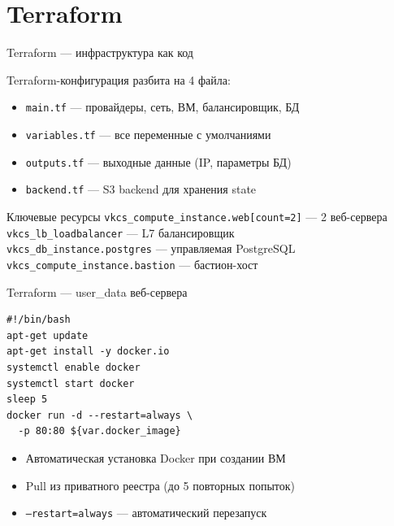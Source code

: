 \documentclass[10pt,aspectratio=169]{beamer}
\begin{document}
\section{Terraform}

\begin{frame}{Terraform --- инфраструктура как код}

  Terraform-конфигурация разбита на 4 файла:

  \begin{itemize}
    \item \texttt{main.tf} --- провайдеры, сеть, ВМ, балансировщик, БД
    \item \texttt{variables.tf} --- все переменные с умолчаниями
    \item \texttt{outputs.tf} --- выходные данные (IP, параметры БД)
    \item \texttt{backend.tf} --- S3 backend для хранения state
  \end{itemize}

  \vspace{0.3cm}
  \begin{block}{Ключевые ресурсы}
    \texttt{vkcs\_compute\_instance.web[count=2]} --- 2 веб-сервера \\
    \texttt{vkcs\_lb\_loadbalancer} --- L7 балансировщик \\
    \texttt{vkcs\_db\_instance.postgres} --- управляемая PostgreSQL \\
    \texttt{vkcs\_compute\_instance.bastion} --- бастион-хост
  \end{block}
\end{frame}

\begin{frame}[fragile]{Terraform --- user\_data веб-сервера}

  \begin{lstlisting}
#!/bin/bash
apt-get update
apt-get install -y docker.io
systemctl enable docker
systemctl start docker
sleep 5
docker run -d --restart=always \
  -p 80:80 ${var.docker_image}
  \end{lstlisting}

  \vspace{0.3cm}
  \begin{itemize}
    \item Автоматическая установка Docker при создании ВМ
    \item Pull из приватного реестра (до 5 повторных попыток)
    \item \texttt{--restart=always} --- автоматический перезапуск
  \end{itemize}
\end{frame}
\end{document}

